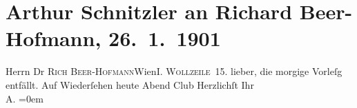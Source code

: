 

         
         \renewcommand{\erwaehntePersonen}{Personen: Richard Beer-Hofmann}
         \renewcommand{\erwaehnteInstitutionen}{Institutionen: Wiener Schachclub}
         \renewcommand{\erwaehnteOrte}{Orte: IX., Alsergrund, Wien, Wollzeile}
         \renewcommand{\erwaehnteWerke}{}
               \section[Arthur Schnitzler an Richard Beer-Hofmann, 26. 1. 1901]{ Arthur Schnitzler an Richard Beer-Hofmann,
                    26. 1. 1901}\nopagebreak{}\rehead{ }\begin{ledgroupsized}[t]{13cm}\normalsize\beginnumbering \toendnotes[C]{\smallbreak\pagebreak[2]} 
\toendnotes[C]{\smallbreak}\pstart{}{\pb}Herrn Dr \textsc{Rich
                            Beer-Hofmann}\pend{}\pstart{}Wien\pend{}\pstart{}\textsc{I. Wollzeile 15}.\pend{}{\bigskip}\pstart
           \noindent{}{\pb}lieber, die morgige Vorleſg entfällt. Auf Wiederſehen heute
                    Abend Club\pend
           \pstart
           Herzlichſt Ihr{\\[\baselineskip]}\spacefill\mbox{A.}\pend
           \leftskip=0em{}
         
         \endnumbering{}\end{ledgroupsized}  \newcommand{\dateiname}{L01095}\newcommand{\titel}{Arthur Schnitzler an Richard Beer-Hofmann, 26. 1. 1901}\newcommand{\editorInnen}{Martin Anton Müller und Gerd-Hermann Susen}
      